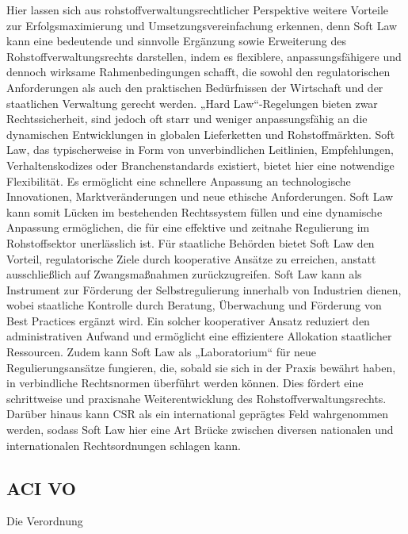 \documentclass[12pt,a4paper,oneside]{book} %
\begin{document}
	Hier lassen sich aus rohstoffverwaltungsrechtlicher Perspektive weitere Vorteile zur Erfolgsmaximierung und Umsetzungsvereinfachung erkennen, denn Soft Law kann eine bedeutende und sinnvolle Ergänzung sowie Erweiterung des Rohstoffverwaltungsrechts darstellen, indem es flexiblere, anpassungsfähigere und dennoch wirksame Rahmenbedingungen schafft, die sowohl den regulatorischen Anforderungen als auch den praktischen Bedürfnissen der Wirtschaft und der staatlichen Verwaltung gerecht werden. „Hard Law“-Regelungen bieten zwar Rechtssicherheit, sind jedoch oft starr und weniger anpassungsfähig an die dynamischen Entwicklungen in globalen Lieferketten und Rohstoffmärkten. Soft Law, das typischerweise in Form von unverbindlichen Leitlinien, Empfehlungen, Verhaltenskodizes oder Branchenstandards existiert, bietet hier eine notwendige Flexibilität. Es ermöglicht eine schnellere Anpassung an technologische Innovationen, Marktveränderungen und neue ethische Anforderungen. Soft Law kann somit Lücken im bestehenden Rechtssystem füllen und eine dynamische Anpassung ermöglichen, die für eine effektive und zeitnahe Regulierung im Rohstoffsektor unerlässlich ist. Für staatliche Behörden bietet Soft Law den Vorteil, regulatorische Ziele durch kooperative Ansätze zu erreichen, anstatt ausschließlich auf Zwangsmaßnahmen zurückzugreifen. Soft Law kann als Instrument zur Förderung der Selbstregulierung innerhalb von Industrien dienen, wobei staatliche Kontrolle durch Beratung, Überwachung und Förderung von Best Practices ergänzt wird. Ein solcher kooperativer Ansatz reduziert den administrativen Aufwand und ermöglicht eine effizientere Allokation staatlicher Ressourcen. Zudem kann Soft Law als „Laboratorium“ für neue Regulierungsansätze fungieren, die, sobald sie sich in der Praxis bewährt haben, in verbindliche Rechtsnormen überführt werden können. Dies fördert eine schrittweise und praxisnahe Weiterentwicklung des Rohstoffverwaltungsrechts. Darüber hinaus kann CSR als ein international geprägtes Feld wahrgenommen werden, sodass Soft Law hier eine Art Brücke zwischen diversen nationalen und internationalen Rechtsordnungen schlagen kann.
	
	
	\subsection{ACI VO}
	Die Verordnung 
	
\end{document}
